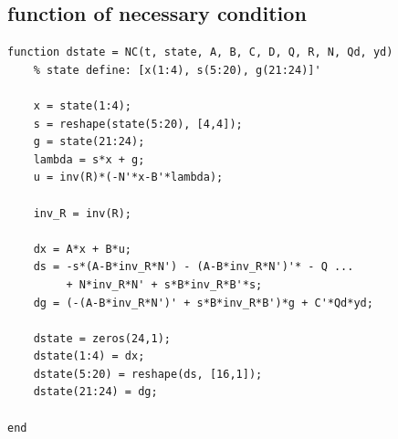 \documentclass[12pt]{article}
\begin{document}
\subsection*{function of necessary condition}

\begin{verbatim}
function dstate = NC(t, state, A, B, C, D, Q, R, N, Qd, yd)
    % state define: [x(1:4), s(5:20), g(21:24)]'

    x = state(1:4);
    s = reshape(state(5:20), [4,4]);
    g = state(21:24);
    lambda = s*x + g;
    u = inv(R)*(-N'*x-B'*lambda);

    inv_R = inv(R);

    dx = A*x + B*u;
    ds = -s*(A-B*inv_R*N') - (A-B*inv_R*N')'* - Q ...
         + N*inv_R*N' + s*B*inv_R*B'*s;
    dg = (-(A-B*inv_R*N')' + s*B*inv_R*B')*g + C'*Qd*yd;

    dstate = zeros(24,1);
    dstate(1:4) = dx;
    dstate(5:20) = reshape(ds, [16,1]);
    dstate(21:24) = dg;

end
\end{verbatim}
\end{document}
